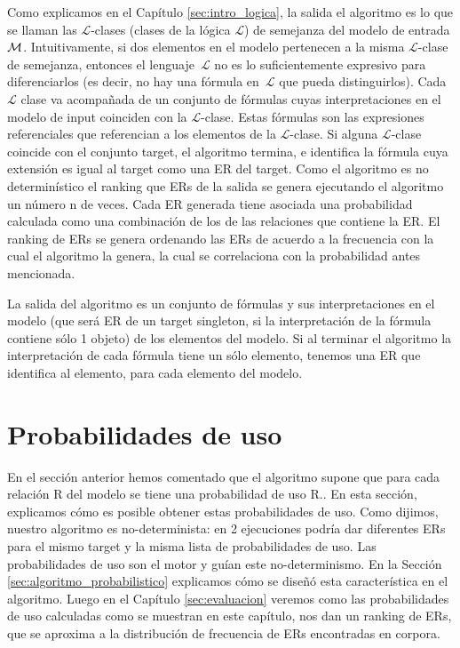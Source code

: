 Como explicamos en el Cap\'itulo \ref{sec:intro_logica}, la salida el algoritmo es lo que se llaman las $\mathcal {L}$-clases (clases de la l\'ogica $\mathcal {L}$) de semejanza del modelo de entrada $\mathcal{M} $. Intuitivamente, si dos elementos en el modelo pertenecen a la misma $\mathcal {L}$-clase de semejanza, entonces el lenguaje~$\mathcal {L}$ no es lo suficientemente expresivo para diferenciarlos (es decir, no hay una f\'ormula en~$\mathcal {L }$ que pueda distinguirlos). Cada  $\mathcal {L}$ clase va acompa\~nada de un conjunto de f\'ormulas cuyas interpretaciones en el modelo de input coinciden con la $\mathcal {L}$-clase. Estas f\'ormulas son las expresiones referenciales que referencian a los elementos de la $\mathcal {L}$-clase. Si alguna $\mathcal {L}$-clase coincide con el conjunto target, el algoritmo termina, e identifica la f\'ormula cuya extensi\'on es igual al target como una ER del target. Como el algoritmo es no determin\'istico el ranking que ERs de la salida se genera ejecutando el algoritmo un n\'umero n de veces. Cada ER generada tiene asociada una probabilidad calculada como una combinaci\'on de los \puse de las relaciones que contiene la ER. El ranking de ERs se genera ordenando las ERs de acuerdo a la frecuencia con la cual el algoritmo la genera, la cual se correlaciona con la probabilidad antes mencionada.

La salida del algoritmo es un conjunto de f\'ormulas y sus interpretaciones en el modelo (que ser\'a ER de un target singleton, si la interpretaci\'on de la f\'ormula contiene s\'olo 1 objeto) de los elementos del modelo. Si al terminar el algoritmo la interpretaci\'on de cada f\'ormula tiene un s\'olo elemento, tenemos una ER que identifica al elemento, para cada elemento del modelo. 

\section{Probabilidades de uso}
\label{sec:learning}

En el secci\'on anterior hemos comentado que el algoritmo supone que para cada relaci\'on R del modelo se tiene una probabilidad de uso R.\puse. En esta secci\'on, explicamos c\'omo es posible obtener estas probabilidades de uso. Como dijimos, nuestro algoritmo es no-determinista: en 2 ejecuciones podr\'ia dar diferentes ERs para el mismo target y la misma lista de probabilidades de uso. Las probabilidades de uso son el motor y gu\'ian este no-determinismo. En la Secci\'on \ref{sec:algoritmo_probabilistico} explicamos c\'omo se dise\~n\'o esta caracter\'istica en el algoritmo. Luego en el Cap\'itulo \ref{sec:evaluacion} veremos como las probabilidades de uso calculadas como se muestran en este cap\'itulo, nos dan un ranking de ERs, que se aproxima a la distribuci\'on de frecuencia de ERs encontradas en corpora.


